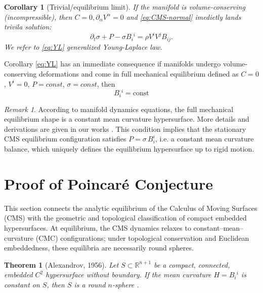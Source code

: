 \documentclass[11pt]{article}
\theoremstyle{definition}
\theoremstyle{plain}
\newtheorem{theorem}[definition]{Theorem}
\newtheorem{corollary}[definition]{Corollary}
\theoremstyle{remark}
\newtheorem{remark}[definition]{Remark}
\begin{document}
\begin{corollary}[Trivial/equilibrium limit]
If the manifold is volume-conserving (incompressible), then $C=0, \partial_\alpha V^\alpha=0$ and \eqref{eq:CMS-normal} imedietly lands trivila solution:
\begin{equation}
\partial_t\sigma + P- \sigma B_i{}^{i}=\rho V^iV^jB_{ij} .
\label{eq:YL}
\end{equation}
We refer to \eqref{eq:YL} generalized Young-Laplace law.
\end{corollary}
Corollary \eqref{eq:YL} has an immediate consequence if manifolds undergo volume-conserving deformations and come in full mechanical equilibrium defined as $C=0$, $V^i=0$, $P=const$, $\sigma=const$, then
\begin{equation}\label{CMC}
B_i{}^{i}=\mathrm{const}
\end{equation}
\begin{remark}
According to manifold dynamics equations, the full mechanical equilibrium shape is a constant mean curvature hypersurface. More details and derivations are given in our works \cite{Svintradze2017, Svintradze2018, Svintradze2019, Svintradze2020, Svintradze2023, Svintradze2024a, Svintradze2024b, Svintradze2025}. This condition implies that the stationary CMS equilibrium configuration satisfies 
$P=\sigma\,B_i^i$, i.e. a constant mean curvature balance, which uniquely 
defines the equilibrium hypersurface up to rigid motion.
\end{remark}


\section{Proof of Poincaré Conjecture}

This section connects the analytic equilibrium of the Calculus of Moving Surfaces (CMS) with the geometric and topological classification of compact embedded hypersurfaces.  
At equilibrium, the CMS dynamics relaxes to constant–mean–curvature (CMC) configurations; under topological conservation and Euclidean embeddedness, these equilibria are necessarily round spheres.

\begin{theorem}[Alexandrov, 1956]\label{thm:Alexandrov}
Let $S \subset \mathbb{R}^{n+1}$ be a compact, connected, embedded $C^2$ hypersurface without boundary.
If the mean curvature $H = B_i{}^{i}$ is constant on $S$, then $S$ is a round $n$-sphere \cite{Alexandrov1962}.
\end{theorem}
\end{document}
